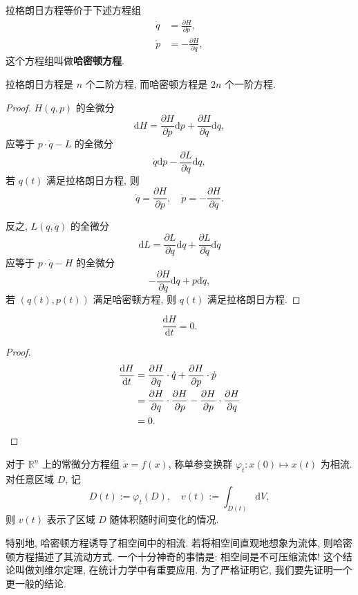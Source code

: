 \begin{theorem}
    拉格朗日方程等价于下述方程组
    \begin{align*}
        \dot{q}&=\frac{\partial H}{\partial p},\\
        \dot{p}&=-\frac{\partial H}{\partial q},
    \end{align*}
    这个方程组叫做{\bf 哈密顿方程}.
\end{theorem}
\begin{remark}
    拉格朗日方程是 $ n $ 个二阶方程, 而哈密顿方程是 $ 2n $ 个一阶方程.
\end{remark}
\begin{proof}
$ H(q,p) $ 的全微分
\[ \mathrm{d}H=\frac{\partial H}{\partial p}\mathrm{d}p+\frac{\partial H}{\partial q}\mathrm{d}q, \]
应等于 $ p\cdot\dot{q}-L $ 的全微分
\[ \dot{q}\mathrm{d}p-\frac{\partial L}{\partial q}\mathrm{d}q, \]
若 $ q(t) $ 满足拉格朗日方程, 则
\[ \dot{q}=\frac{\partial H}{\partial p},\quad \dot{p}=-\frac{\partial H}{\partial q}. \]

反之, $ L(q,\dot{q}) $ 的全微分
\[ \mathrm{d}L=\frac{\partial L}{\partial q}\mathrm{d}q+\frac{\partial L}{\partial\dot{q}}\mathrm{d}\dot{q} \]
应等于 $ p\cdot\dot{q}-H $ 的全微分
\[ -\frac{\partial H}{\partial q}\mathrm{d}q+p\mathrm{d}\dot{q}, \]
若 $ (q(t),p(t)) $ 满足哈密顿方程, 则 $ q(t) $ 满足拉格朗日方程.
\end{proof}
\begin{corollary}[能量守恒]\keepline
    \[ \frac{\mathrm{d}H}{\mathrm{d}t}=0. \] 
\end{corollary}
\vspace{0ex}
\begin{proof}\keepline
    \begin{align*}
        \frac{\mathrm{d}H}{\mathrm{d}t} &= \frac{\partial H}{\partial q}\cdot{\dot{q}}+\frac{\partial H}{\partial p}\cdot{\dot{p}}\\ 
        &= \frac{\partial H}{\partial q}\cdot\frac{\partial H}{\partial p}-\frac{\partial H}{\partial p}\cdot\frac{\partial H}{\partial q}\\ 
        &= 0.\qedhere
    \end{align*}
\end{proof}

对于 $ \mathbb{R}^n $ 上的常微分方程组 $ \dot{x}=f(x) $, 称单参变换群 $ \varphi_t:x(0)\mapsto x(t) $ 为相流. 对任意区域 $ D $, 记
\[ D(t):=\varphi_t(D),\quad v(t):=\int_{D(t)}\mathrm{d}V, \]
则 $v(t)$ 表示了区域 $D$ 随体积随时间变化的情况.

特别地, 哈密顿方程诱导了相空间中的相流. 若将相空间直观地想象为流体, 则哈密顿方程描述了其流动方式. 一个十分神奇的事情是: 相空间是不可压缩流体! 这个结论叫做刘维尔定理, 在统计力学中有重要应用. 为了严格证明它, 我们要先证明一个更一般的结论.

